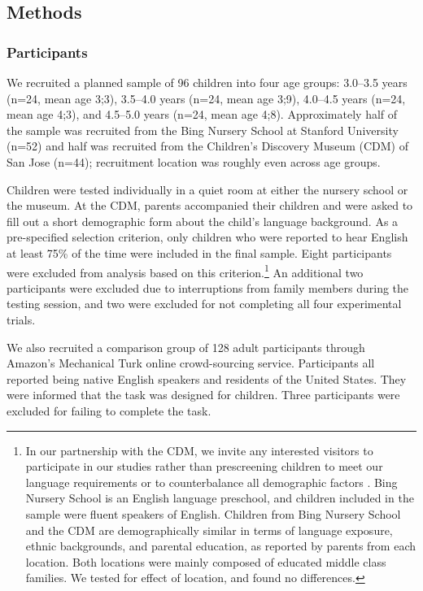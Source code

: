 \documentclass[man]{apa2}
\begin{document}
\subsection{Methods}

\subsubsection{Participants}

We recruited a planned sample of 96 children into four age groups: 3.0--3.5 years (n=24, mean age 3;3), 3.5--4.0 years (n=24, mean age 3;9), 4.0--4.5 years (n=24, mean age 4;3), and 4.5--5.0 years (n=24, mean age 4;8).  Approximately half of the sample was recruited from the Bing Nursery School at Stanford University (n=52) and half was recruited from the Children's Discovery Museum (CDM) of San Jose (n=44); recruitment location was roughly even across age groups.
  
Children were tested individually in a quiet room at either the nursery school or the museum. At the CDM, parents accompanied their children and were asked to fill out a short demographic form about the child's language background. As a pre-specified selection criterion, only children who were reported to hear English at least 75\% of the time were included in the final sample.  Eight participants were excluded from analysis based on this criterion.\footnote{In our partnership with the CDM, we invite any interested visitors to participate in our studies rather than prescreening children to meet our language requirements or to counterbalance all demographic factors \cite{callanan2012}. Bing Nursery School is an English language preschool, and children included in the sample were fluent speakers of English. Children from Bing Nursery School and the CDM are demographically similar in terms of language exposure, ethnic backgrounds, and parental education, as reported by parents from each location.  Both locations were mainly composed of educated middle class families.  We tested for effect of location, and found no differences.}  An additional two participants were excluded due to interruptions from family members during the testing session, and two were excluded for not completing all four experimental trials. 

We also recruited a comparison group of 128 adult participants through Amazon's Mechanical Turk online crowd-sourcing service.  Participants all reported being native English speakers and residents of the United States. They were informed that the task was designed for children. Three participants were excluded for failing to complete the task.  
\end{document}
